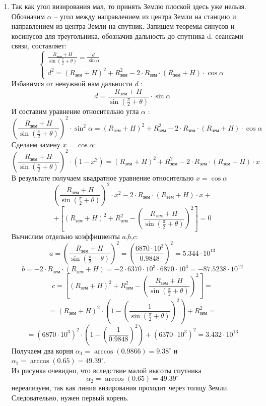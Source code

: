 \begin{enumerate}
    \item Так как угол визирования мал, то принять Землю плоской здесь уже нельзя. Обозначим $\alpha$ – угол между направлением из центра Земли на станцию и направлением из центра Земли на спутник. Запишем теоремы синусов и косинусов для треугольника, обозначив дальность до спутника d. 
    сеансами связи, составляет:
    \begin{equation*}\nonumber
    \begin{cases}
    \frac{R_\text{зем}+H}{\sin\left(\frac{\pi}{2}+\theta\right)}=\frac{d}{\sin\alpha}
    \\
    d^2=(R_\text{зем}+H)^2+R_\text{зем}^2-2\cdot R_\text{зем}\cdot(R_\text{зем}+H)\cdot\cos\alpha
    \end{cases}
    \end{equation*}
    Избавимся от ненужной нам дальности $d$ :
    $$d=\frac{R_\text{зем}+H}{\sin\left(\frac{\pi}{2}+\theta\right)}\cdot\sin\alpha$$
    И составим уравнение относительно угла $\alpha$ :
    $$\left(\frac{R_\text{зем}+H}{\sin\left(\frac{\pi}{2}+\theta\right)}\right)^2\cdot \sin^2\alpha =(R_\text{зем}+H)^2+R_\text{зем}^2-2\cdot R_\text{зем}\cdot(R_\text{зем}+H)\cdot\cos\alpha$$
    Сделаем замену $x=\cos\alpha$:
    $$\left(\frac{R_\text{зем}+H}{\sin\left(\frac{\pi}{2}+\theta\right)}\right)^2\cdot(1-x^2 )=(R_\text{зем}+H)^2+R_\text{зем}^2-2\cdot R_\text{зем}\cdot(R_\text{зем}+H)\cdot x$$
    В результате получаем квадратное уравнение относительно $x=\cos\alpha$
    $$\left(\frac{R_\text{зем}+H}{\sin\left(\frac{\pi}{2}+\theta\right)}\right)^2\cdot x^2-2\cdot R_\text{зем}\cdot(R_\text{зем}+H)\cdot x+$$
    $$+\left[(R_\text{зем}+H)^2+R_\text{зем}^2-\left(\frac{R_\text{зем}+H}{\sin\left(\frac{\pi}{2}+\theta\right)}\right)^2\right]=0$$
    Вычислим отдельно коэффициенты $a$,$b$,$c$:
    $$a=\left(\frac{R_\text{зем}+H}{\sin\left(\frac{\pi}{2}+\theta\right)}\right)^2=\left(\frac{6870\cdot10^3}{0.9848}\right)^2=5.344\cdot10^{13}$$
    $$b=-2\cdot R_\text{зем}\cdot(R_\text{зем}+H)=-2\cdot6370\cdot10^3\cdot6870\cdot10^3=-87.5238\cdot10^{12}$$
    $$c=\left[(R_\text{зем}+H)^2+R_\text{зем}^2-\left(\frac{R_\text{зем}+H}{\sin\left(\frac{\pi}{2}+\theta\right)}\right)^2\right]=$$
    $$=(R_\text{зем}+H)^2\cdot\left(1-\left(\frac{1}{\sin\left(\frac{\pi}{2}+\theta\right)}\right)^2\right)+R_\text{зем}^2=$$
    $$=(6870\cdot10^3 )^2\cdot\left(1-\left(\frac{1}{0.9848}\right)^2\right)+(6370\cdot10^3)^2=3.432\cdot10^{13}$$
    Получаем два корня $\alpha_1=\arccos(0.9866)=9.38^\circ$ и $\alpha_2=\arccos(0.65)=49.39^\circ$. \\
    Из рисунка очевидно, что вследствие малой высоты спутника  $$\alpha_2=\arccos(0.65)=49.39^\circ$$ нереализуем, так как линия визирования проходит через толщу Земли. Следовательно, нужен первый корень.                     
    

\end{enumerate}
